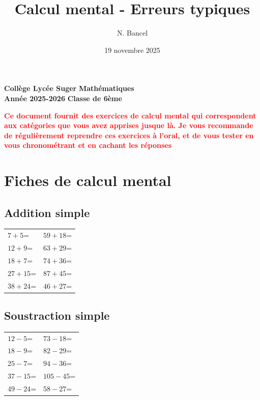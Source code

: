 \documentclass[answers]{exam}
\title{Calcul mental - Erreurs typiques}
\author{N. Bancel}
\date{19 novembre 2025}
\newcommand{\ex}[1]{#1\;=\;\dotfill}
\begin{document}
\textbf{Collège Lycée Suger}
\hfill
\textbf{Mathématiques} \\

\textbf{Année 2025-2026}
\hfill
\textbf{Classe de 6ème} \par

{\let\newpage\relax\maketitle}

\begin{center}
  \textbf{\textcolor{red}{Ce document fournit des exercices de calcul mental qui correspondent aux catégories que vous avez apprises jusque là. Je vous recommande de régulièrement reprendre ces exercices à l'oral, et de vous tester en vous chronométrant et en cachant les réponses}} \\
\end{center}

\section{Fiches de calcul mental}

\subsection*{Addition simple}
\begin{center}
\begin{tabular}{|L|L|}
\hline
\ex{$7+5$} & \ex{$59+18$} \\
\ex{$12+9$} & \ex{$63+29$} \\
\ex{$18+7$} & \ex{$74+36$} \\
\ex{$27+15$} & \ex{$87+45$} \\
\ex{$38+24$} & \ex{$46+27$} \\
\hline
\end{tabular}
\end{center}

\subsection*{Soustraction simple}
\begin{center}
\begin{tabular}{|L|L|}
\hline
\ex{$12-5$} & \ex{$73-18$} \\
\ex{$18-9$} & \ex{$82-29$} \\
\ex{$25-7$} & \ex{$94-36$} \\
\ex{$37-15$} & \ex{$105-45$} \\
\ex{$49-24$} & \ex{$58-27$} \\
\hline
\end{tabular}
\end{center}
\end{document}

